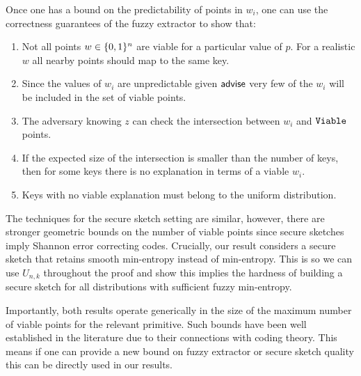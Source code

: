 Once one has a bound on the predictability of points in $w_i$, one can use the correctness guarantees of the fuzzy extractor to show that:
\begin{enumerate}
\item Not all points $w\in\{0, 1\}^n$ are viable for a particular value of $p$.  For a realistic $w$ all nearby points should map to the same key.
\item Since the values of $w_i$ are unpredictable given ${\mathsf{advise}}$ very few of the $w_i$ will be included in the set of viable points.
\item The adversary knowing $z$ can check the intersection between $w_i$ and $\mathtt{Viable}$ points.  
\item If the expected size of the intersection is smaller than the number of keys, then for some keys there is no explanation in terms of a viable $w_i$.
\item Keys with no viable explanation must belong to the uniform distribution.
\end{enumerate}

The techniques for the secure sketch setting are similar, however, there are stronger geometric bounds on the number of viable points since secure sketches imply Shannon error correcting codes.  Crucially, our result considers a secure sketch that retains smooth min-entropy instead of min-entropy.  This is so we can use $U_{n,k}$ throughout the proof and show this implies the hardness of building a secure sketch for all distributions with sufficient fuzzy min-entropy.  


Importantly, both results operate generically in the size of the maximum number of viable points for the relevant primitive.  Such bounds have been well established in the literature due to their connections with coding theory.  This means if one can provide a new bound on fuzzy extractor or secure sketch quality this can be directly used in our results.
